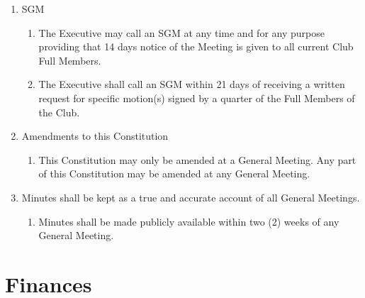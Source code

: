 \documentclass[a4paper]{article}
\begin{document}
\begin{enumerate}
		\item \acf{SGM}
		\begin{enumerate}
			\item The Executive may call an \ac{SGM} at any time and for any purpose providing that 14 days notice of the Meeting is given to all current Club Full Members.
			
			\item The Executive shall call an \ac{SGM} within 21 days of receiving a written request for specific motion(s) signed by a quarter of the Full Members of the Club.
		\end{enumerate}
	
		\item Amendments to this Constitution
		\begin{enumerate}
			\item This Constitution may only be amended at a General Meeting. Any part of this Constitution may be amended at any General Meeting.
		\end{enumerate}
	
		\item Minutes shall be kept as a true and accurate account of all General Meetings.
		\begin{enumerate}
			\item Minutes shall be made publicly available within two (2) weeks of any General Meeting.
		\end{enumerate}
	\end{enumerate}
	
	\section{Finances}
	
\end{document}
